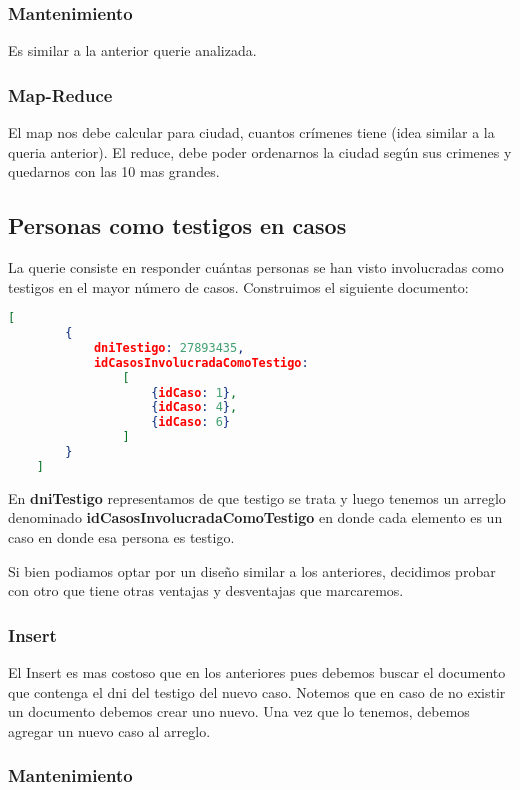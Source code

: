 \documentclass[11pt, a4paper]{article}
\begin{document}
\subsubsection{Mantenimiento}

Es similar a la anterior querie analizada.

\subsubsection{Map-Reduce}

El map nos debe calcular para ciudad, cuantos cr\'imenes tiene (idea similar a la queria anterior). El reduce, debe poder ordenarnos la ciudad seg\'un sus crimenes y quedarnos con las 10 mas grandes.

\subsection{Personas como testigos en casos}

La querie consiste en responder cuántas personas se han visto involucradas como testigos en el mayor número de casos. Construimos el siguiente documento:

\begin{lstlisting}[language=json]
	[
		{
			dniTestigo: 27893435,
			idCasosInvolucradaComoTestigo:
				[
					{idCaso: 1},
					{idCaso: 4},
					{idCaso: 6}
				]
		}
	]
\end{lstlisting}

En \textbf{dniTestigo} representamos de que testigo se trata y luego tenemos un arreglo denominado \textbf{idCasosInvolucradaComoTestigo} en donde cada elemento es un caso en donde esa persona es testigo.\

Si bien podiamos optar por un dise\~no similar a los anteriores, decidimos probar con otro que tiene otras ventajas y desventajas que marcaremos.

\subsubsection{Insert}

El Insert es mas costoso que en los anteriores pues debemos buscar el documento que contenga el dni del testigo del nuevo caso. Notemos que en caso de no existir un documento debemos crear uno nuevo. Una vez que lo tenemos, debemos agregar un nuevo caso al arreglo.

\subsubsection{Mantenimiento}
\end{document}
